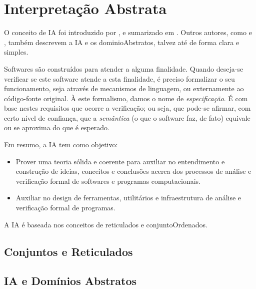 \chapter{Interpretação Abstrata} \label{fundamentacao_ia}

O conceito de \gls{IA} foi introduzido por , e 
sumarizado em . Outros autores, como 
 e , também 
descrevem a \gls{IA} e os \glspl{dominioAbstrato}, talvez até de forma clara e 
simples.

Softwares são construídos para atender a alguma finalidade. Quando deseja-se 
verificar se este software atende a esta finalidade, é preciso formalizar o seu 
funcionamento, seja através de mecanismos de linguagem, ou externamente ao 
código-fonte original. À este formalismo, damos o nome de \emph{especificação}. 
É com base nestes requisitos que ocorre a verificação; ou seja, que pode-se 
afirmar, com certo nível de confiança, que a \emph{semântica} (o que o software 
faz, de fato) equivale ou se aproxima do que é esperado.

Em resumo, a \gls{IA} tem como objetivo:

\begin{itemize}
    \item Prover uma teoria sólida e coerente para auxiliar no entendimento e 
    construção de ideias, conceitos e conclusões acerca dos processos de 
    análise e verificação formal de softwares e programas computacionais.
    
    \item Auxiliar no design de ferramentas, utilitários e infraestrutura de 
    análise e verificação formal de programas.
\end{itemize}

A \gls{IA} é baseada nos conceitos de \glspl{reticulado} e 
\glspl{conjuntoOrdenado}. 

    \section{Conjuntos e Reticulados}


    \section{IA e Domínios Abstratos}
    
